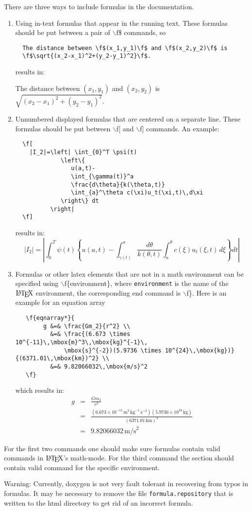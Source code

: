 There are three ways to include formulas in the documentation. \begin{enumerate}
\item Using in-text formulas that appear in the running text. These formulas should be put between a pair of $\backslash$f\$ commands, so 

\footnotesize\begin{verbatim}
  The distance between \f$(x_1,y_1)\f$ and \f$(x_2,y_2)\f$ is 
  \f$\sqrt{(x_2-x_1)^2+(y_2-y_1)^2}\f$.
\end{verbatim}
\normalsize
 results in:

The distance between $(x_1,y_1)$ and $(x_2,y_2)$ is $\sqrt{(x_2-x_1)^2+(y_2-y_1)^2}$. \par
 \item Unnumbered displayed formulas that are centered on a separate line. These formulas should be put between $\backslash$f\mbox{[} and $\backslash$f\mbox{]} commands. An example: 

\footnotesize\begin{verbatim}
  \f[
    |I_2|=\left| \int_{0}^T \psi(t) 
             \left\{ 
                u(a,t)-
                \int_{\gamma(t)}^a 
                \frac{d\theta}{k(\theta,t)}
                \int_{a}^\theta c(\xi)u_t(\xi,t)\,d\xi
             \right\} dt
          \right|
  \f]
\end{verbatim}
\normalsize
 results in: \[ |I_2|=\left| \int_{0}^T \psi(t) \left\{ u(a,t)- \int_{\gamma(t)}^a \frac{d\theta}{k(\theta,t)} \int_{a}^\theta c(\xi)u_t(\xi,t)\,d\xi \right\} dt \right| \] \item Formulas or other latex elements that are not in a math environment can be specified using $\backslash$f\{environment\}, where {\tt environment} is the name of the $\mbox{\LaTeX}$ environment, the corresponding end command is $\backslash$f\}. Here is an example for an equation array 

\footnotesize\begin{verbatim}
   \f{eqnarray*}{
        g &=& \frac{Gm_2}{r^2} \\ 
          &=& \frac{(6.673 \times 10^{-11}\,\mbox{m}^3\,\mbox{kg}^{-1}\,
              \mbox{s}^{-2})(5.9736 \times 10^{24}\,\mbox{kg})}{(6371.01\,\mbox{km})^2} \\ 
          &=& 9.82066032\,\mbox{m/s}^2
   \f}
\end{verbatim}
\normalsize
 which results in: \begin{eqnarray*} g &=& \frac{Gm_2}{r^2} \\ &=& \frac{(6.673 \times 10^{-11}\,\mbox{m}^3\,\mbox{kg}^{-1}\, \mbox{s}^{-2})(5.9736 \times 10^{24}\,\mbox{kg})}{(6371.01\,\mbox{km})^2} \\ &=& 9.82066032\,\mbox{m/s}^2 \end{eqnarray*} \end{enumerate}
For the first two commands one should make sure formulas contain valid commands in $\mbox{\LaTeX}$'s math-mode. For the third command the section should contain valid command for the specific environment.

\begin{Desc}
\item[Warning:]Currently, doxygen is not very fault tolerant in recovering from typos in formulas. It may be necessary to remove the file {\tt formula.repository} that is written to the html directory to get rid of an incorrect formula.\end{Desc}
 